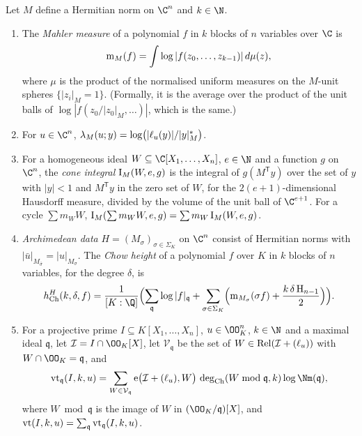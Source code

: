 \begin{definition}\label{pf:covol:def:chowht}
Let $M$ define a Hermitian norm on $\C^n$ and $k\in\N$.
\begin{enumerate}[label=(\alph*)]
\item The \emph{Mahler measure} of a polynomial $f$ in $k$ blocks of $n$ variables over $\C$ is
  \[
  \operatorname{m}_M(f)=\int\log|f(z_0,\dots,z_{k-1})|\,d\mu(z),
  \]
  where $\mu$ is the product of the normalised uniform measures on the $M$-unit spheres
  $\{|z_i|_M=1\}$. (Formally, it is the average over the product of the unit balls of
  $\log|f(z_0/|z_0|_M,\dots)|$, which is the same.)
\item For $u\in\C^n$, $\lambda_M(u;y)=\log\bigl(|\ell_u(y)|/|y|^*_M\bigr)$.
\item For a homogeneous ideal $W\subseteq\C[X_1,\dots,X_n]$, $e\in\N$ and a function $g$ on $\C^n$,
  the \emph{cone integral} $\operatorname{I}_M(W,e,g)$ is the integral of $g(M^{\mathsf T}y)$ over the set of
  $y$ with $|y|<1$ and $M^{\mathsf T}y$ in the zero set of $W$, for the $2(e+1)$-dimensional Hausdorff
  measure, divided by the volume of the unit ball of $\C^{e+1}$. For a cycle $\sum m_WW$,
  $\operatorname{I}_M(\sum m_WW,e,g)=\sum m_W\operatorname{I}_M(W,e,g)$.
\item \emph{Archimedean data} $H=(M_\sigma)_{\sigma\in\Sigma_K}$ on $\C^n$ consist of Hermitian norms
  with $|\bar u|_{M_{\bar\sigma}}=|u|_{M_\sigma}$. The \emph{Chow height} of a polynomial $f$ over $K$
  in $k$ blocks of $n$ variables, for the degree $\delta$, is
  \begin{equation}\label{pf:covol:eq:chowht}
  \covolHch^H(k,\delta,f)=\frac1{[K:\Q]}\Bigl(\sum_{\mathfrak q}\log|f|_{\mathfrak q}+
  \sum_{\sigma\in\Sigma_K}\Bigl(\covolMah_{M_\sigma}(\sigma f)+\frac{k\,\delta\,\covolHar_{n-1}}2\Bigr)\Bigr).
  \end{equation}
\item For a projective prime $I\subseteq K[X_1,\dots,X_n]$, $u\in\OO_K^n$, $k\in\N$ and a maximal ideal
  $\mathfrak q$, let $\mathcal I=I\cap\OO_K[X]$, let $\mathcal V_{\mathfrak q}$ be the set of
  $W\in\operatorname{Rel}(\mathcal I+(\ell_u))$ with $W\cap\OO_K=\mathfrak q$, and
  \[
  \covolVt_{\mathfrak q}(I,k,u)=\sum_{W\in\mathcal V_{\mathfrak q}}\covolLm\bigl(\mathcal I+(\ell_u),W\bigr)\,
  \covolCdeg(W\bmod\mathfrak q,k)\log\Nm(\mathfrak q),
  \]
  where $W\bmod\mathfrak q$ is the image of $W$ in $(\OO_K/\mathfrak q)[X]$, and
  $\operatorname{vt}(I,k,u)=\sum_{\mathfrak q}\operatorname{vt}_{\mathfrak q}(I,k,u)$.
\end{enumerate}
%
\end{definition}

